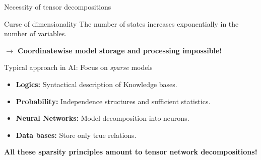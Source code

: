 \documentclass{beamer}
\begin{document}
    \begin{frame}{Necessity of tensor decompositions}

        \begin{block}{Curse of dimensionality}
            The number of states increases exponentially in the number of variables. \\
            \begin{center}
                \bf  $\rightarrow$ Coordinatewise model storage and processing impossible!
            \end{center}
        \end{block}

        Typical approach in AI: Focus on \emph{sparse} models
        \begin{itemize}
            \item {\bf Logics:} Syntactical description of Knowledge bases.
            \item {\bf Probability:} Independence structures and sufficient statistics.
            \item {\bf Neural Networks:} Model decomposition into neurons.
            \item {\bf Data bases:} Store only true relations.
        \end{itemize}

        \begin{center}
            \bf All these sparsity principles amount to tensor network decompositions!
        \end{center}

    \end{frame}
\end{document}
